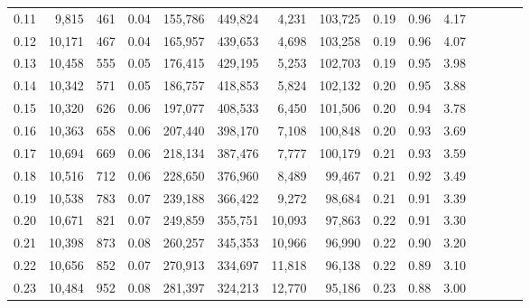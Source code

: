 \begin{tabular}{rrrcrrrrrrrrrrr}
0.11 &   9,815 &     461 &                                       0.04 &  155,786 &  449,824 &    4,231 &  103,725 &  0.19 &  0.96 &                         4.17 \\
0.12 &  10,171 &     467 &                                       0.04 &  165,957 &  439,653 &    4,698 &  103,258 &  0.19 &  0.96 &                         4.07 \\
0.13 &  10,458 &     555 &                                       0.05 &  176,415 &  429,195 &    5,253 &  102,703 &  0.19 &  0.95 &                         3.98 \\
0.14 &  10,342 &     571 &                                       0.05 &  186,757 &  418,853 &    5,824 &  102,132 &  0.20 &  0.95 &                         3.88 \\
0.15 &  10,320 &     626 &                                       0.06 &  197,077 &  408,533 &    6,450 &  101,506 &  0.20 &  0.94 &                         3.78 \\
0.16 &  10,363 &     658 &                                       0.06 &  207,440 &  398,170 &    7,108 &  100,848 &  0.20 &  0.93 &                         3.69 \\
0.17 &  10,694 &     669 &                                       0.06 &  218,134 &  387,476 &    7,777 &  100,179 &  0.21 &  0.93 &                         3.59 \\
0.18 &  10,516 &     712 &                                       0.06 &  228,650 &  376,960 &    8,489 &   99,467 &  0.21 &  0.92 &                         3.49 \\
0.19 &  10,538 &     783 &                                       0.07 &  239,188 &  366,422 &    9,272 &   98,684 &  0.21 &  0.91 &                         3.39 \\
0.20 &  10,671 &     821 &                                       0.07 &  249,859 &  355,751 &   10,093 &   97,863 &  0.22 &  0.91 &                         3.30 \\
0.21 &  10,398 &     873 &                                       0.08 &  260,257 &  345,353 &   10,966 &   96,990 &  0.22 &  0.90 &                         3.20 \\
0.22 &  10,656 &     852 &                                       0.07 &  270,913 &  334,697 &   11,818 &   96,138 &  0.22 &  0.89 &                         3.10 \\
0.23 &  10,484 &     952 &                                       0.08 &  281,397 &  324,213 &   12,770 &   95,186 &  0.23 &  0.88 &                         3.00 \\

\end{tabular}
